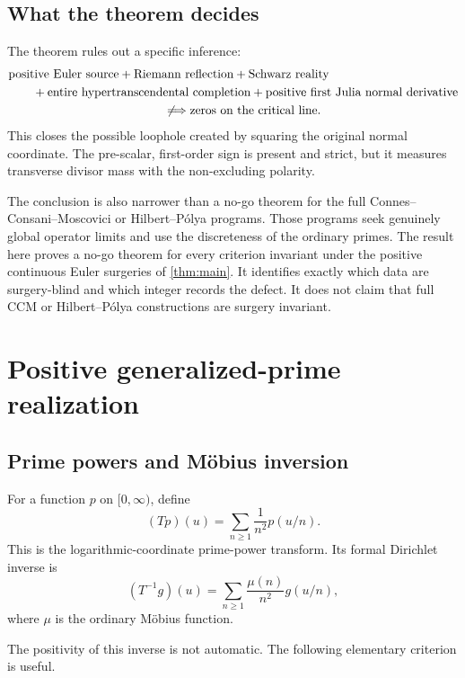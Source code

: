 \documentclass[11pt]{article}
\begin{document}
\subsection{What the theorem decides}

The theorem rules out a specific inference:
\[
\begin{split}
&\text{positive Euler source}
+\text{Riemann reflection}
+\text{Schwarz reality}\\
&\qquad
+\text{entire hypertranscendental completion}
+\text{positive first Julia normal derivative}\\
&\hspace{45mm}\not\Longrightarrow
\text{zeros on the critical line}.
\end{split}
\]
This closes the possible loophole created by squaring the original normal
coordinate.  The pre-scalar, first-order sign is present and strict, but it
measures transverse divisor mass with the non-excluding polarity.

The conclusion is also narrower than a no-go theorem for the full
Connes--Consani--Moscovici or Hilbert--P\'olya programs.  Those programs
seek genuinely global operator limits and use the discreteness of the
ordinary primes.  The result here proves a no-go theorem for every
criterion invariant under the positive continuous Euler surgeries of
\cref{thm:main}.  It identifies exactly which data are surgery-blind and
which integer records the defect.  It does not claim that full CCM or
Hilbert--P\'olya constructions are surgery invariant.

\section{Positive generalized-prime realization}
\label{sec:euler}

\subsection{Prime powers and M\"obius inversion}

For a function \(p\) on \([0,\infty)\), define
\[
 (Tp)(u)=\sum_{n\geq1}\frac1{n^2}p(u/n).
\]
This is the logarithmic-coordinate prime-power transform.  Its formal
Dirichlet inverse is
\[
 (T^{-1}g)(u)
 =\sum_{n\geq1}\frac{\mu(n)}{n^2}g(u/n),
\]
where \(\mu\) is the ordinary M\"obius function.

The positivity of this inverse is not automatic.  The following
elementary criterion is useful.
\end{document}
